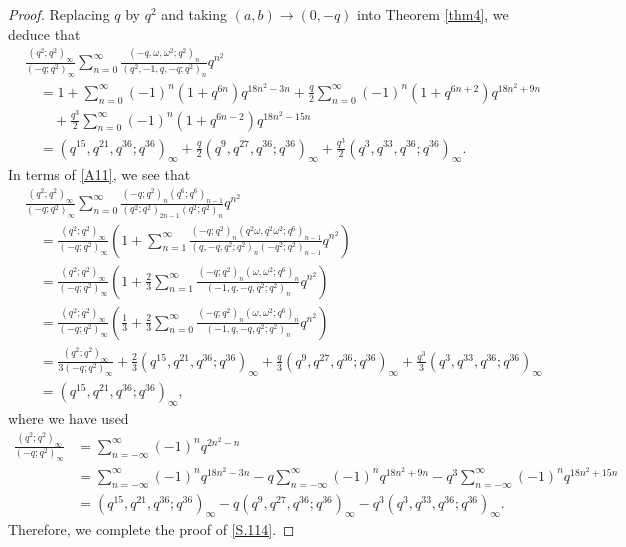 \documentclass[reqno,12pt]{amsart}
\theoremstyle{remark}
\numberwithin{equation}{section}
\begin{document}
\begin{proof}
Replacing $q$ by $q^2$ and taking $\left(a,b\right)\to\left(0,-q\right)$ into Theorem \ref{thm4}, we deduce that
\begin{align}
&\frac{\left(q^2;q^2\right)_{\infty}}{\left(-q;q^2\right)_{\infty}}
\sum_{n=0}^{\infty}\frac{\left(-q,\omega,\omega^2;q^2\right)_n}
{\left(q^2,-1,q,-q;q^2\right)_n}q^{n^2}
\nonumber\\
&\quad=1+\sum_{n=0}^{\infty}\left(-1\right)^n\left(1+q^{6n}\right)q^{18n^2-3n}
+\frac{q}{2}\sum_{n=0}^{\infty}\left(-1\right)^n\left(1+q^{6n+2}\right)q^{18n^2+9n}
\nonumber\\
&\qquad+\frac{q^3}{2}\sum_{n=0}^{\infty}\left(-1\right)^n
\left(1+q^{6n-2}\right)q^{18n^2-15n}\nonumber\\
&\quad=\left(q^{15},q^{21},q^{36};q^{36}\right)_{\infty}
+\frac{q}{2}\left(q^{9},q^{27},q^{36};q^{36}\right)_{\infty}
+\frac{q^3}{2}\left(q^{3},q^{33},q^{36};q^{36}\right)_{\infty}.\label{A11}
\end{align}
In terms of \eqref{A11}, we see that
\begin{align*}
&\frac{\left(q^2;q^2\right)_{\infty}}{\left(-q;q^2\right)_{\infty}}
\sum_{n=0}^{\infty}\frac{\left(-q;q^2\right)_n\left(q^6;q^6\right)_{n-1}}
{\left(q^2;q^2\right)_{2n-1}\left(q^2;q^2\right)_n}q^{n^2}\\
&\quad=
\frac{\left(q^2;q^2\right)_{\infty}}{\left(-q;q^2\right)_{\infty}}
\left(1+\sum_{n=1}^{\infty}\frac{\left(-q;q^2\right)_n
\left(q^2\omega,q^2\omega^2;q^6\right)_{n-1}}
{\left(q,-q,q^2;q^2\right)_{n}\left(-q^2;q^2\right)_{n-1}}q^{n^2}
\right)\\
&\quad=
\frac{\left(q^2;q^2\right)_{\infty}}{\left(-q;q^2\right)_{\infty}}
\left(1+\frac{2}{3}\sum_{n=1}^{\infty}\frac{\left(-q;q^2\right)_n
\left(\omega,\omega^2;q^6\right)_{n}}
{\left(-1,q,-q,q^2;q^2\right)_{n}}q^{n^2}
\right)\\
&\quad=
\frac{\left(q^2;q^2\right)_{\infty}}{\left(-q;q^2\right)_{\infty}}
\left(\frac{1}{3}+\frac{2}{3}\sum_{n=0}^{\infty}\frac{\left(-q;q^2\right)_n
\left(\omega,\omega^2;q^6\right)_{n}}
{\left(-1,q,-q,q^2;q^2\right)_{n}}q^{n^2}
\right)\\
&\quad=\frac{\left(q^2;q^2\right)_{\infty}}{3\left(-q;q^2\right)_{\infty}}
+\frac{2}{3}\left(q^{15},q^{21},q^{36};q^{36}\right)_{\infty}
+\frac{q}{3}\left(q^{9},q^{27},q^{36};q^{36}\right)_{\infty}
+\frac{q^3}{3}\left(q^{3},q^{33},q^{36};q^{36}\right)_{\infty}\\
&\quad=\left(q^{15},q^{21},q^{36};q^{36}\right)_{\infty},
\end{align*}
where we have used
\begin{align*}
\frac{\left(q^2;q^2\right)_{\infty}}{\left(-q;q^2\right)_{\infty}}
&=\sum_{n=-\infty}^{\infty}\left(-1\right)^nq^{2n^2-n}\\
&=\sum_{n=-\infty}^{\infty}\left(-1\right)^nq^{18n^2-3n}
-q\sum_{n=-\infty}^{\infty}\left(-1\right)^nq^{18n^2+9n}
-q^3\sum_{n=-\infty}^{\infty}\left(-1\right)^nq^{18n^2+15n}
\\
&=\left(q^{15},q^{21},q^{36};q^{36}\right)_{\infty}
-q\left(q^{9},q^{27},q^{36};q^{36}\right)_{\infty}
-q^3\left(q^{3},q^{33},q^{36};q^{36}\right)_{\infty}.
\end{align*}
Therefore, we complete the proof of \eqref{S.114}.
\end{proof}
\end{document}
